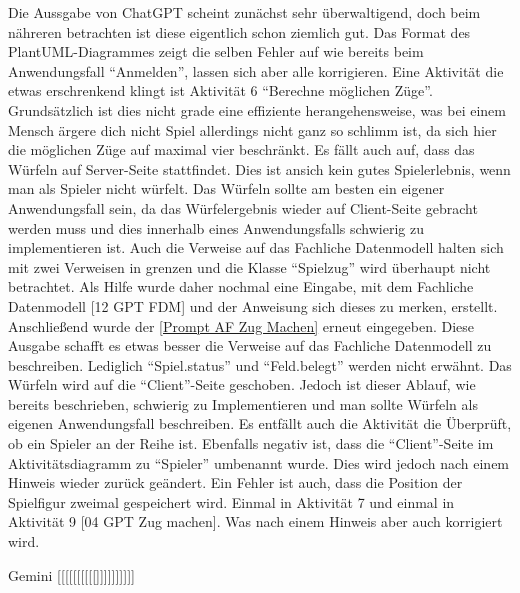 Die Aussgabe von ChatGPT scheint zunächst sehr überwaltigend, doch beim nähreren betrachten ist diese eigentlich schon ziemlich gut. Das Format des PlantUML-Diagrammes
zeigt die selben Fehler auf wie bereits beim Anwendungsfall ``Anmelden'', lassen sich aber alle korrigieren. Eine Aktivität die etwas erschrenkend klingt ist Aktivität 6 
``Berechne möglichen Züge''. Grundsätzlich ist dies nicht grade eine effiziente herangehensweise, was bei einem Mensch ärgere dich nicht Spiel allerdings nicht ganz so
schlimm ist, da sich hier die möglichen Züge auf maximal vier beschränkt. Es fällt auch auf, dass das Würfeln auf Server-Seite stattfindet. Dies ist ansich kein gutes 
Spielerlebnis, wenn man als Spieler nicht würfelt. Das 
Würfeln sollte am besten ein eigener Anwendungsfall sein, da das Würfelergebnis wieder auf Client-Seite gebracht werden muss und dies innerhalb eines Anwendungsfalls
schwierig zu implementieren ist. Auch die Verweise auf das Fachliche Datenmodell halten sich mit zwei Verweisen in grenzen und die Klasse ``Spielzug'' wird überhaupt nicht
betrachtet. Als Hilfe wurde daher nochmal eine Eingabe, mit dem Fachliche Datenmodell [12 GPT FDM] und der Anweisung sich dieses zu merken, erstellt. Anschließend wurde 
der \autoref{Prompt AF Zug Machen} erneut eingegeben. Diese Ausgabe schafft es etwas besser die Verweise auf das Fachliche Datenmodell zu beschreiben. Lediglich ``Spiel.status''
und ``Feld.belegt'' werden nicht erwähnt. Das Würfeln wird auf die ``Client''-Seite geschoben. Jedoch ist dieser Ablauf, wie bereits beschrieben, 
schwierig zu Implementieren und man sollte Würfeln als eigenen Anwendungsfall beschreiben. Es entfällt auch die Aktivität die Überprüft, ob ein Spieler an der Reihe ist. 
Ebenfalls negativ ist, dass die ``Client''-Seite im Aktivitätsdiagramm zu ``Spieler'' 
umbenannt wurde. Dies wird jedoch nach einem Hinweis wieder zurück geändert. Ein Fehler ist auch, dass die Position der Spielfigur zweimal gespeichert wird. Einmal in Aktivität 7
und einmal in Aktivität 9 [04 GPT Zug machen]. Was nach einem Hinweis aber auch korrigiert wird. %

Gemini [[[[[[[[[[]]]]]]]]]]\\

